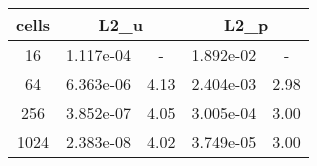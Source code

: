 \documentclass[10pt]{report}
\begin{document}
\begin{table}[H]
\begin{center}
\begin{tabular}{|c|c|c|c|c|} \hline
cells & 
\multicolumn{2}{|c|}{L2_u} & 
\multicolumn{2}{|c|}{L2_p}\\ \hline
16 & 1.117e-04 & - & 1.892e-02 & -\\ \hline
64 & 6.363e-06 & 4.13 & 2.404e-03 & 2.98\\ \hline
256 & 3.852e-07 & 4.05 & 3.005e-04 & 3.00\\ \hline
1024 & 2.383e-08 & 4.02 & 3.749e-05 & 3.00\\ \hline
\end{tabular}
\end{center}
\end{table}
\end{document}
